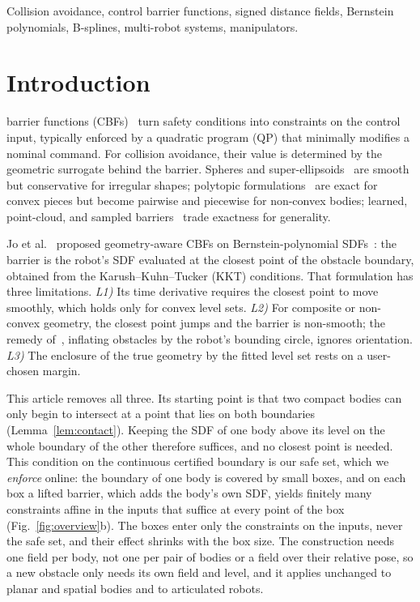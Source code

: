\documentclass[journal]{IEEEtran}
\theoremstyle{definition}
\begin{document}
\begin{IEEEkeywords}
Collision avoidance, control barrier functions, signed distance fields, Bernstein polynomials,
B-splines, multi-robot systems, manipulators.
\end{IEEEkeywords}

\section{Introduction}\label{sec:intro}

 barrier functions (CBFs)~\cite{ames2019cbf} turn safety conditions into
constraints on the control input, typically enforced by a quadratic program (QP) that minimally
modifies a nominal command. For collision avoidance, their value is determined by the geometric
surrogate behind the barrier. Spheres and super-ellipsoids~\cite{wang2017safety,wang2017quadrotors}
are smooth but conservative for irregular shapes; polytopic
formulations~\cite{chen2025minkowski,thirugnanam2025strongly} are exact for convex pieces but become
pairwise and piecewise for non-convex bodies; learned, point-cloud, and sampled
barriers~\cite{khan2022gaussian,long2021learning,dai2024sailing,lutkus2025sampling} trade exactness
for generality.

Jo et al.~\cite{jo2026geometry} proposed geometry-aware CBFs on Bernstein-polynomial
SDFs~\cite{li2024representing}: the barrier is the robot's SDF evaluated at the closest point of the
obstacle boundary, obtained from the Karush--Kuhn--Tucker (KKT) conditions. That formulation has
three limitations. \emph{L1)} Its time derivative requires the closest point to move smoothly, which
holds only for convex level sets. \emph{L2)} For composite or non-convex geometry, the closest point
jumps and the barrier is non-smooth; the remedy of~\cite{jo2026geometry}, inflating obstacles by
the robot's bounding circle, ignores orientation. \emph{L3)} The enclosure of the true geometry by
the fitted level set rests on a user-chosen margin.

This article removes all three. Its starting point is that two compact bodies can only begin to
intersect at a point that lies on both boundaries (Lemma~\ref{lem:contact}). Keeping the SDF of one
body above its level on the whole boundary of the other therefore suffices, and no closest point is
needed. This condition on the continuous certified boundary is our safe set, which we
\emph{enforce} online: the boundary of one body is covered by small boxes, and on each box a lifted
barrier, which adds the body's own SDF, yields finitely many constraints affine in the inputs that
suffice at every point of the box (Fig.~\ref{fig:overview}b). The boxes enter only the constraints on
the inputs, never the safe set, and their effect shrinks with the box size. The construction
needs one field per body, not one per pair of bodies or a field over their relative pose, so a new
obstacle only needs its own field and level, and it applies unchanged to planar and spatial bodies
and to articulated robots.
\end{document}
